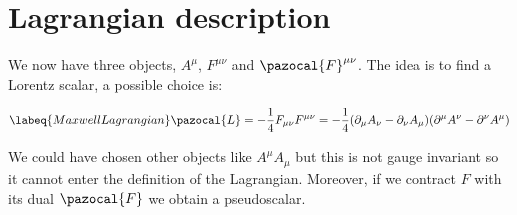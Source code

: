 \documentclass[../main.tex]{subfiles}
\begin{document}
\section{Lagrangian description}
We now have three objects, $A^\mu$, $F^{\mu\nu}$ and $\pazocal{F}^{\mu\nu}$. The idea is to find a Lorentz scalar, a possible choice is:
\begin{kaobox}[frametitle=Lagrangian density of the electromagnetic field]
\begin{equation}
\labeq{MaxwellLagrangian}
\pazocal{L}=-\frac{1}{4}F_{\mu\nu}F^{\mu\nu}=-\frac{1}{4}(\partial_\mu A_\nu-\partial_\nu A_\mu)(\partial^\mu A^\nu-\partial^\nu A^\mu)
\end{equation}
\end{kaobox}
We could have chosen other objects like $A^\mu A_\mu$ but this is not gauge invariant so it cannot enter the definition of the Lagrangian. Moreover, if we contract $F$ with its dual $\pazocal{F}$ we obtain a pseudoscalar.
\end{document}
